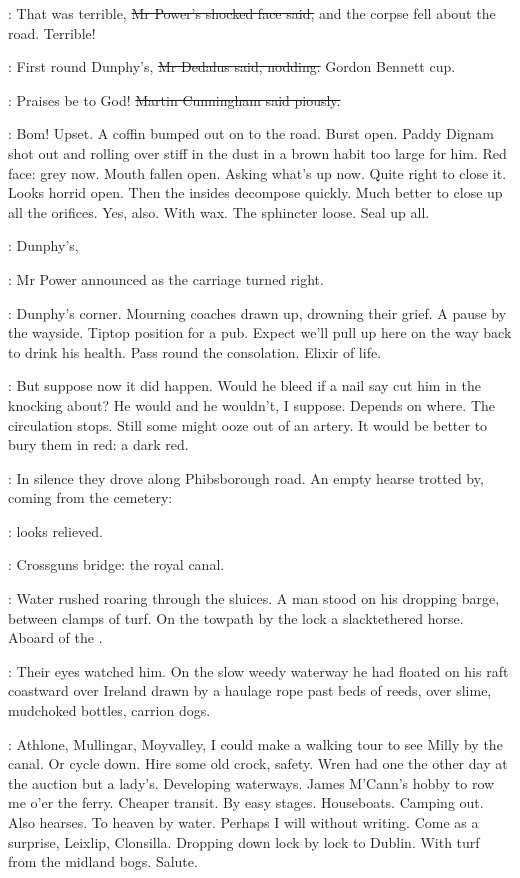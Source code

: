 \power:
That was terrible,
\sout{Mr Power's shocked face said,}
and the corpse fell about the road.
Terrible!

\simon:
First round Dunphy's,
\sout{Mr Dedalus said, nodding.}
Gordon Bennett cup.

\cunningham:
Praises be to God!
\sout{Martin Cunningham said piously.}

\BloomInt:
Bom!
Upset.
A coffin bumped out on to the road.
Burst open.
Paddy Dignam shot out and rolling over stiff in the dust
in a brown habit too large for him.
Red face:
grey now.
Mouth fallen open.
Asking what's up now.
Quite right to close it.
Looks horrid open.
Then the insides decompose quickly.
Much better to close up all the orifices.
Yes, also.
With wax.
The sphincter loose.
Seal up all.

\power:
Dunphy's,

:
Mr Power announced
as the carriage turned right.

\BloomInt:
Dunphy's corner.
Mourning coaches drawn up, drowning their grief.
A pause by the wayside.
Tiptop position for a pub.
Expect we'll pull up here on the way back to drink his health.
Pass round the consolation.
Elixir of life.

\BloomInt:
But suppose now it did happen.
Would he bleed if a nail say cut him in the knocking about?
He would and he wouldn't, I suppose.
Depends on where.
The circulation stops.
Still some might ooze out of an artery.
It would be better to bury them in red:
a dark red.

:
In silence they drove along Phibsborough road.
An empty hearse trotted by, coming from the cemetery:

\BloomInt:
looks relieved.

:
Crossguns bridge:
the royal canal.

:
Water rushed roaring through the sluices.
A man stood on his
dropping barge, between clamps of turf.
On the towpath by the lock
a slacktethered horse.
Aboard of the .

:
Their eyes watched him.
On the slow weedy waterway
he had floated on his raft coastward over Ireland
drawn by a haulage rope
past beds of reeds,
over slime, mudchoked bottles, carrion dogs.

\BloomInt:
Athlone, Mullingar, Moyvalley,
I could make a walking tour to see Milly by the canal.
Or cycle down.
Hire some old crock, safety.
Wren had one the other day at the auction but a lady's.
Developing waterways.
James M'Cann's hobby to row me o'er the ferry.
Cheaper transit.
By easy stages.
Houseboats.
Camping out.
Also hearses.
To heaven by water.
Perhaps I will without writing.
Come as a surprise, Leixlip, Clonsilla.
Dropping down lock by lock to Dublin.
With turf from the midland bogs.
Salute.

